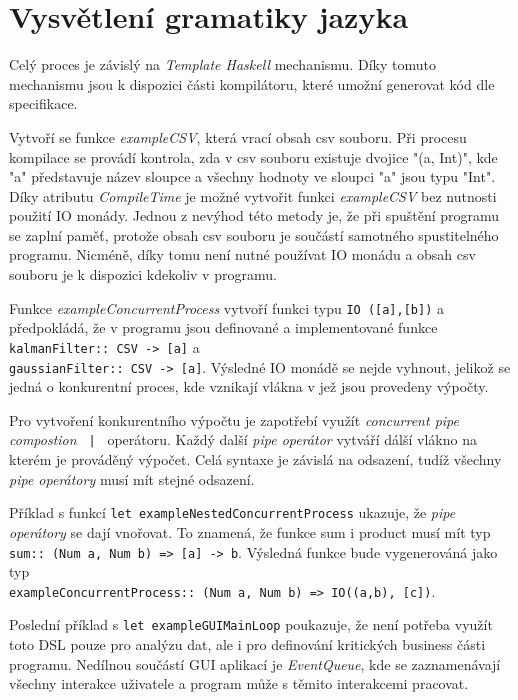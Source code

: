 \documentclass[male,czech]{kithesis}
\newcommand{\haskellInline}[1]{\colorbox{gray!10}{\texttt{#1}}}
\begin{document}
\section{Vysvětlení gramatiky jazyka}

Celý proces je závislý na \textit{Template Haskell} mechanismu. Díky tomuto mechanismu jsou k dispozici části kompilátoru, které umožní generovat kód dle specifikace.

Vytvoří se funkce \textit{exampleCSV}, která vrací obsah csv souboru. Při procesu kompilace se provádí kontrola, zda v csv souboru existuje dvojice "(a, Int)", kde "a" představuje název sloupce a všechny hodnoty ve sloupci "a" jsou typu "Int".
Díky atributu \textit{CompileTime} je možné vytvořit funkci \textit{exampleCSV} bez nutnosti použití IO monády. Jednou z nevýhod této metody je, že při spuštění programu se zaplní paměť, protože obsah csv souboru je součástí samotného spustitelného programu.
Nicméně, díky tomu není nutné používat IO monádu a obsah csv souboru je k dispozici kdekoliv v programu.

Funkce \textit{exampleConcurrentProcess} vytvoří funkci typu \haskellInline{IO ([a],[b])} a předpokládá, že v programu jsou definované a implementované funkce
\haskellInline{kalmanFilter:: CSV -> [a]} a \\
\haskellInline{gaussianFilter:: CSV -> [a]}. Výsledné IO monádě se nejde vyhnout, jelikož se jedná o konkurentní proces, kde vznikají vlákna v jež jsou provedeny výpočty. 

Pro vytvoření konkurentního výpočtu je zapotřebí využít \textit{concurrent pipe compostion}
\haskellInline{ | } operátoru. Každý další \textit{pipe operátor} vytváří dálší vlákno na kterém je prováděný výpočet.
Celá syntaxe je závislá na odsazení, tudíž všechny \textit{pipe operátory} musí mít stejné odsazení.

Příklad s funkcí \haskellInline{let exampleNestedConcurrentProcess} ukazuje, že \textit{pipe operátory} se dají vnořovat.
To znamená, že funkce sum i product musí mít typ
\haskellInline{sum:: (Num a, Num b) => [a] -> b}. Výsledná funkce bude vygenerováná jako typ \\
\haskellInline{exampleConcurrentProcess:: (Num a, Num b) => IO((a,b), [c])}.

Poslední příklad s \haskellInline{let exampleGUIMainLoop} poukazuje, že není potřeba využít toto DSL pouze pro analýzu dat, ale
i pro definování kritických business části programu. Nedílnou součástí GUI aplikací je \textit{EventQueue}, kde
se zaznamenávají všechny interakce uživatele a program může s těmito interakcemi pracovat.
\end{document}
